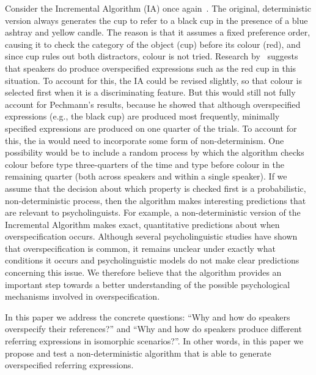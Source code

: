 Consider the Incremental Algorithm (IA) once again~\cite{dale95}. The original, deterministic version always generates the cup to refer to a black cup in the
presence of a blue ashtray and yellow candle. The reason is that it assumes a fixed preference order, causing it to check the category of the object (cup) before its colour (red), and since cup rules out both distractors, colour is not tried. Research by~\cite{pechmann89} suggests that speakers do produce overspecified expressions
such as the red cup in this situation. To account for this, the IA could be revised slightly, so that colour is selected first when it is a discriminating feature. But this would still not fully account for Pechmann's results, because he showed that although overspecified expressions (e.g., the black cup) are produced most frequently, minimally specified expressions are produced on one quarter of the trials. To account for this, the ia would need to incorporate some form of non-determinism. One possibility would be to include a random process by which the algorithm checks colour before type three-quarters of the time and type before colour in the remaining quarter (both across speakers and within a single speaker). If we assume that the decision about which property is checked first is a probabilistic, non-deterministic process, then the algorithm makes interesting predictions that are relevant to psycholinguists. For example, a non-deterministic version of the Incremental Algorithm makes exact, quantitative predictions about when overspecification occurs. Although several psycholinguistic studies have shown that overspecification is common, it remains unclear under exactly what conditions it occurs and psycholinguistic models do not make clear predictions concerning this issue. We therefore believe that the algorithm provides an important step towards a better understanding of the possible psychological mechanisms involved in overspecification.

In this paper we address the concrete questions: ``Why and how do speakers overspecify their references?'' and ``Why and how do speakers produce different referring expressions in isomorphic scenarios?''. In other words, in this paper we propose and test a non-deterministic algorithm that is able to generate overspecified referring expressions.  



